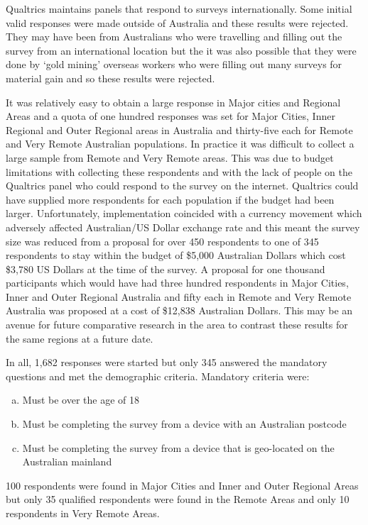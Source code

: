 Qualtrics maintains panels that respond to surveys internationally. Some initial valid responses were made outside of Australia and these results were rejected. They may have been from Australians who were travelling and filling out the survey from an international location but the it was also possible that they were done by `gold mining' overseas workers who were filling out many surveys for material gain and so these results were rejected. 

It was relatively easy to obtain a large response in Major cities and Regional Areas and a quota of one hundred responses was set for Major Cities, Inner Regional and Outer Regional areas in Australia and thirty-five each for Remote and Very Remote Australian populations. In practice it was difficult to collect a large sample from Remote and Very Remote areas. This was due to budget limitations with collecting these respondents and with the lack of people on the Qualtrics panel who could respond to the survey on the internet. Qualtrics could have supplied more respondents for each population if the budget had been larger. Unfortunately, implementation coincided with a currency movement which adversely affected Australian/US Dollar exchange rate and this meant the survey size was reduced from a proposal for over 450 respondents to one of 345 respondents to stay within the budget of \$5,000 Australian Dollars which cost \$3,780 US Dollars at the time of the survey. A proposal for one thousand participants which would have had three hundred respondents in Major Cities, Inner and Outer Regional Australia and fifty each in Remote and Very Remote Australia was proposed at a cost of \$12,838 Australian Dollars. This may be an avenue for future comparative research in the area to contrast these results for the same regions at a future date.

In all, 1,682 responses were started but only 345 answered the mandatory questions and met the demographic criteria. Mandatory criteria were:
\begin{enumerate}[(a)]
\item Must be over the age of 18
\item Must be completing the survey from a device with an Australian postcode
\item Must be completing the survey from a device that is geo-located on the Australian mainland
\end{enumerate}

100 respondents were found in Major Cities and Inner and Outer Regional Areas but only 35 qualified respondents were found in the Remote Areas and only 10 respondents in Very Remote Areas.

